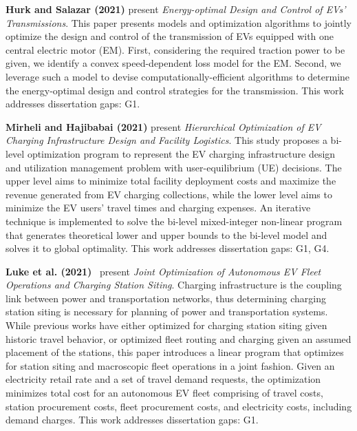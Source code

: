 \documentclass[letterpaper, 12pt, oneside, doublespacing]{Thesis}
\begin{document}
\noindent \textbf{Hurk and Salazar (2021)} present \textit{Energy-optimal Design and Control of EVs' Transmissions}. This paper presents models and optimization algorithms to jointly optimize the design and control of the transmission of EVs equipped with one central electric motor (EM). First, considering the required traction power to be given, we identify a convex speed-dependent loss model for the EM. Second, we leverage such a model to devise computationally-efficient algorithms to determine the energy-optimal design and control strategies for the transmission. This work addresses dissertation gaps: G1.



\noindent \textbf{Mirheli and Hajibabai (2021)} present \textit{Hierarchical Optimization of EV Charging Infrastructure Design and Facility Logistics}. This study proposes a bi-level optimization program to represent the EV charging infrastructure design and utilization management problem with user-equilibrium (UE) decisions. The upper level aims to minimize total facility deployment costs and maximize the revenue generated from EV charging collections, while the lower level aims to minimize the EV users' travel times and charging expenses. An iterative technique is implemented to solve the bi-level mixed-integer non-linear program that generates theoretical lower and upper bounds to the bi-level model and solves it to global optimality. This work addresses dissertation gaps: G1, G4.



\noindent \textbf{Luke et al. (2021)}~\cite{joint_optimization_2021} present \textit{Joint Optimization of Autonomous EV Fleet Operations and Charging Station Siting}. Charging infrastructure is the coupling link between power and transportation networks, thus determining charging station siting is necessary for planning of power and transportation systems. While previous works have either optimized for charging station siting given historic travel behavior, or optimized fleet routing and charging given an assumed placement of the stations, this paper introduces a linear program that optimizes for station siting and macroscopic fleet operations in a joint fashion. Given an electricity retail rate and a set of travel demand requests, the optimization minimizes total cost for an autonomous EV fleet comprising of travel costs, station procurement costs, fleet procurement costs, and electricity costs, including demand charges. This work addresses dissertation gaps: G1.
\end{document}
